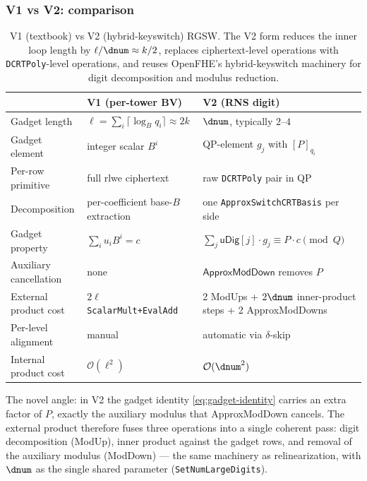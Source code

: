 \subsubsection{V1 vs V2: comparison}
\label{sec:rgsw:v1-vs-v2}

\begin{table}[h!]
\centering
\begin{tabular}{lll}
\toprule
& \textbf{V1 (per-tower BV)} & \textbf{V2 (RNS digit)} \\
\midrule
Gadget length & $\ell = \sum_i \lceil \log_B q_i \rceil \approx 2k$ & $\dnum$, typically $2$--$4$ \\
Gadget element & integer scalar $B^i$ & QP-element $g_j$ with $[P]_{q_i}$ \\
Per-row primitive & full \gls{rlwe} ciphertext & raw \texttt{DCRTPoly} pair in QP \\
Decomposition & per-coefficient base-$B$ extraction & one \texttt{ApproxSwitchCRTBasis} per side \\
Gadget property & $\sum_i u_i B^i = c$ & $\sum_j \mathsf{uDig}[j] \cdot g_j \equiv P \cdot c \pmod Q$ \\
Auxiliary cancellation & none & $\mathsf{ApproxModDown}$ removes $P$ \\
External product cost & $2\ell$ \texttt{ScalarMult+EvalAdd} & 2 ModUps + $2\dnum$ inner-product steps + 2 ApproxModDowns \\
Per-level alignment & manual & automatic via $\delta$-skip \\
Internal product cost & $\mathcal{O}(\ell^2)$ & $\mathcal{O}(\dnum^2)$ \\
\bottomrule
\end{tabular}
\caption{V1 (textbook) vs V2 (hybrid-keyswitch) RGSW. The V2 form reduces the inner loop length by $\ell / \dnum \approx k/2$, replaces ciphertext-level operations with \texttt{DCRTPoly}-level operations, and reuses OpenFHE's hybrid-keyswitch machinery for digit decomposition and modulus reduction.}
\label{tab:v1-vs-v2}
\end{table}

The novel angle: in V2 the gadget identity \eqref{eq:gadget-identity} carries an extra factor of $P$, exactly the auxiliary modulus that \textsf{ApproxModDown} cancels. The external product therefore fuses three operations into a single coherent pass: digit decomposition (ModUp), inner product against the gadget rows, and removal of the auxiliary modulus (ModDown) --- the same machinery as relinearization, with $\dnum$ as the single shared parameter (\texttt{SetNumLargeDigits}).
\fi

\ifnotes
\newpage

\fi